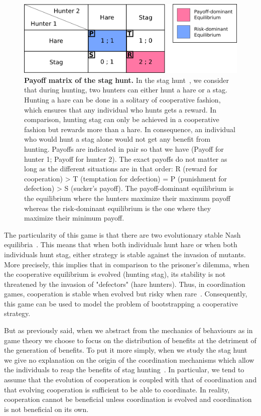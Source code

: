     \begin{figure}[hbt]
        \begin{center}
          \includegraphics[scale = 0.50]{fig/Intro/StagHunt.png}
          \caption{\textbf{Payoff matrix of the stag hunt.} 
          In the stag hunt~\parencite{Skyrms2004}, we consider that during hunting, two hunters can either hunt a hare or a stag. Hunting a hare can be done in a solitary of cooperative fashion, which ensures that any individual who hunts gets a reward. In comparison, hunting stag can only be achieved in a cooperative fashion but rewards more than a hare. In consequence, an individual who would hunt a stag alone would not get any benefit from hunting. Payoffs are indicated in pair so that we have (Payoff for hunter 1; Payoff for hunter 2). The exact payoffs do not matter as long as the different situations are in that order: R (reward for cooperation) > T (temptation for defection) = P (punishment for defection) > S (sucker's payoff). The payoff-dominant equilibrium is the equilibrium where the hunters maximize their maximum payoff whereas the risk-dominant equilibrium is the one where they maximize their minimum payoff.} 
          \label{fig:MatrixStagHunt}
        \end{center}
    \end{figure}

    The particularity of this game is that there are two evolutionary stable Nash equilibria~\parencite{Nash1950, MaynardSmith1973}. This means that when both individuals hunt hare or when both individuals hunt stag, either strategy is stable against the invasion of mutants. More precisely, this implies that in comparison to the prisoner's dilemma, when the cooperative equilibrium is evolved (hunting stag), its stability is not threatened by the invasion of "defectors" (hare hunters). Thus, in coordination games, cooperation is stable when evolved but risky when rare~\parencite{Forber2015}. Consequently, this game can be used to model the problem of bootstrapping a cooperative strategy.

    But as previously said, when we abstract from the mechanics of behaviours as in game theory we choose to focus on the distribution of benefits at the detriment of the generation of benefits. To put it more simply, when we study the stag hunt we give no explanation on the origin of the coordination mechanisms which allow the individuals to reap the benefits of stag hunting~\parencite{Calcott2007a}. In particular, we tend to assume that the evolution of cooperation is coupled with that of coordination and that evolving cooperation is sufficient to be able to coordinate. In reality, cooperation cannot be beneficial unless coordination is evolved and coordination is not beneficial on its own.

